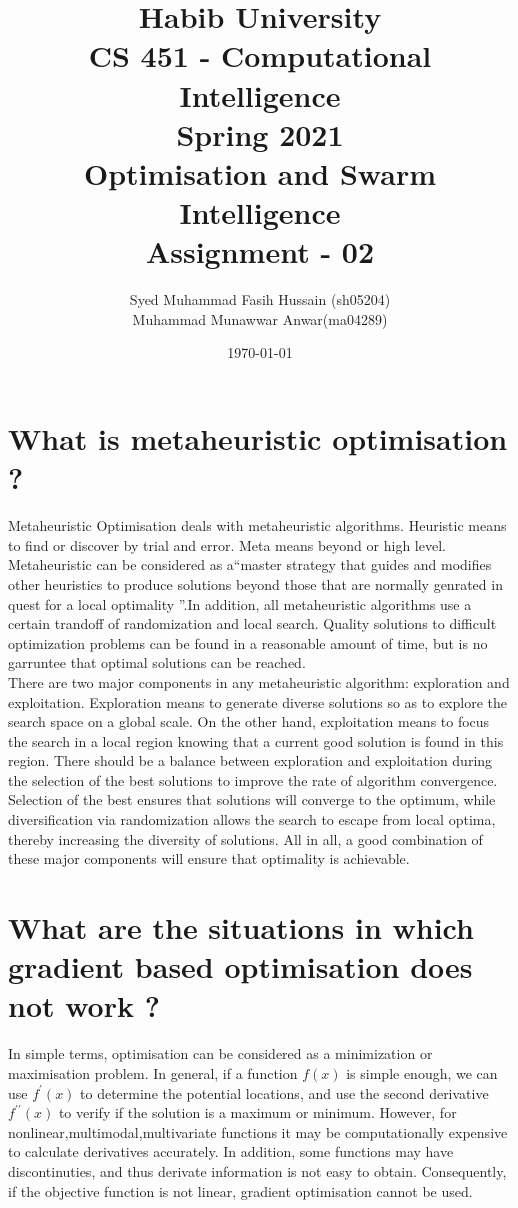 \documentclass[a4paper]{article}
\title{Habib University \\ CS 451  - Computational Intelligence\\ Spring 2021 \\ Optimisation  and Swarm Intelligence\\Assignment  - 02}
\author{Syed Muhammad Fasih Hussain (sh05204) \\Muhammad Munawwar Anwar(ma04289)}
\date{\today}
\begin{document}
\setlength{\parskip}{10pt}
\setlength{\parindent}{0pt}
\maketitle
\section*{What is metaheuristic optimisation ?}
Metaheuristic Optimisation deals with metaheuristic algorithms. Heuristic means to find or discover by trial and error. Meta means beyond or high level. 
Metaheuristic can be considered as a``master strategy  that guides and modifies other heuristics to produce solutions beyond those that are normally genrated 
in quest for a local optimality ''.In  addition, all metaheuristic algorithms use a certain trandoff of randomization and local search. Quality solutions 
to difficult optimization problems can be found in a reasonable amount of time, but is no garruntee that optimal solutions can be reached. \\


There are two major components in any metaheuristic algorithm: exploration and exploitation. Exploration means to generate diverse solutions so as to 
explore the search space on a global scale. On the other hand, exploitation means to focus the search in a local region knowing that a
current good solution is found in this region. There should be a balance between exploration and exploitation during the selection of the best 
solutions to improve the rate of algorithm convergence. Selection of the best ensures that solutions will converge to the optimum, 
while diversification via randomization allows the search to escape from local optima, thereby increasing the diversity of solutions. All in all, a good combination
of these major components will ensure that optimality is achievable.




\section*{What are the situations in which gradient based optimisation does not work ?}
In simple terms, optimisation can be considered as a minimization or maximisation problem. In general, if a function $f(x)$ is simple enough, we can use $f^{\prime}(x)$ to determine the potential locations, 
and use the second derivative $f^{\prime\prime}(x)$ to verify if the solution is a maximum or minimum. However, for nonlinear,multimodal,multivariate functions it may be computationally expensive to calculate 
derivatives accurately. In addition, some functions may have discontinuties, and thus derivate information is not easy to obtain. Consequently, if the objective function is not linear, gradient optimisation cannot
be used. 
\end{document}
